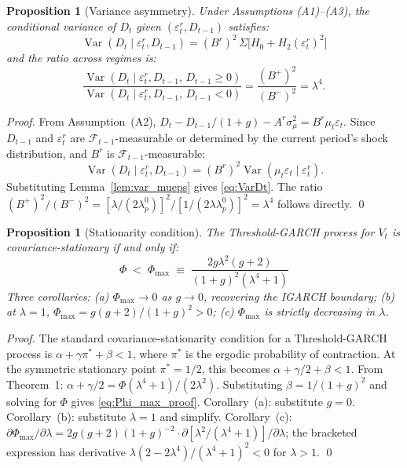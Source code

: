 \documentclass[12pt,a4paper]{article}
\newtheorem{proposition}[theorem]{Proposition}
\theoremstyle{definition}
\begin{document}
\begin{proposition}[Variance asymmetry]
\label{prop:var_asym}\label{prop:Vt_ratio}
Under Assumptions (A1)--(A3), the conditional variance of $D_t$
given $(\varepsilon^r_t, D_{t-1})$ satisfies:
\begin{equation}
  \operatorname{Var}(D_t \mid \varepsilon^r_t, D_{t-1})
  = (B^r)^2\,\Sigma\bigl[H_0 + H_2(\varepsilon^r_t)^2\bigr]
  \label{eq:VarDt}
\end{equation}
and the ratio across regimes is:
\[
\frac{\operatorname{Var}(D_t \mid \varepsilon^r_t, D_{t-1},\,
  D_{t-1}\geq0)}
     {\operatorname{Var}(D_t \mid \varepsilon^r_t, D_{t-1},\,
  D_{t-1}<0)}
= \frac{(B^+)^2}{(B^-)^2} = \lambda^4.
\]
\end{proposition}

\begin{proof}
From Assumption~(A2), $D_t - D_{t-1}/(1+g) - A^r\sigma^2_\mu =
B^r\mu_t\varepsilon_t$. Since $D_{t-1}$ and $\varepsilon^r_t$ are
$\mathcal{F}_{t-1}$-measurable or determined by the current period's
shock distribution, and $B^r$ is $\mathcal{F}_{t-1}$-measurable:
\[
\operatorname{Var}(D_t \mid \varepsilon^r_t, D_{t-1})
= (B^r)^2\operatorname{Var}(\mu_t\varepsilon_t \mid \varepsilon^r_t).
\]
Substituting Lemma~\ref{lem:var_mueps} gives \eqref{eq:VarDt}. The
ratio $(B^+)^2/(B^-)^2 = [\lambda/(2\lambda^0_p)]^2 /
[1/(2\lambda\lambda^0_p)]^2 = \lambda^4$ follows directly.
\qed
\end{proof}

\begin{proposition}[Stationarity condition]
\label{prop:stationarity}
The Threshold-GARCH process for $V_t$ is covariance-stationary if
and only if:
\begin{equation}
  \Phi \;<\; \Phi_{\max} \;\equiv\;
  \frac{2g\lambda^2(g+2)}{(1+g)^2(\lambda^4+1)}
  \label{eq:Phi_max_proof}
\end{equation}
Three corollaries: (a) $\Phi_{\max} \to 0$ as $g \to 0$, recovering
the IGARCH boundary; (b) at $\lambda = 1$, $\Phi_{\max} =
g(g+2)/(1+g)^2 > 0$; (c) $\Phi_{\max}$ is strictly decreasing
in $\lambda$.
\end{proposition}

\begin{proof}
The standard covariance-stationarity condition for a Threshold-GARCH
process is $\alpha + \gamma\pi^* + \beta < 1$, where $\pi^*$ is the
ergodic probability of contraction. At the symmetric stationary point
$\pi^* = 1/2$, this becomes $\alpha + \gamma/2 + \beta < 1$. From
Theorem~1: $\alpha + \gamma/2 = \Phi(\lambda^4+1)/(2\lambda^2)$.
Substituting $\beta = 1/(1+g)^2$ and solving for $\Phi$ gives
\eqref{eq:Phi_max_proof}. Corollary~(a): substitute $g=0$.
Corollary~(b): substitute $\lambda=1$ and simplify. Corollary~(c):
$\partial\Phi_{\max}/\partial\lambda = 2g(g+2)(1+g)^{-2}
\cdot\partial[\lambda^2/(\lambda^4+1)]/\partial\lambda$;
the bracketed expression has derivative
$\lambda(2-2\lambda^4)/(\lambda^4+1)^2 < 0$ for $\lambda > 1$.
\qed
\end{proof}
\end{document}
